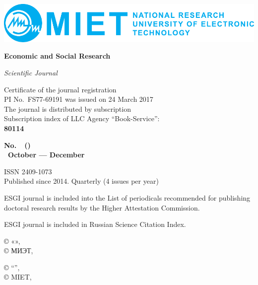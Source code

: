 \begin{center}
  \includegraphics[width=\textwidth]{logo-en}

  {\fontsize{16pt}{20pt}\selectfont\bfseries Economic and Social Research \par}

  {\itshape Scientific Journal}
\end{center}

\noindent
\begin{minipage}{.5\textwidth}
  \small
  Certificate of the journal registration\\
  PI No. FS77-69191 was issued on 24 March 2017\\
  The journal is distributed by subscription\\
  Subscription index of LLC Agency ``Book-Service'':\\
\textbf{80114}
\end{minipage}%
\begin{minipage}{.5\textwidth}
\begin{flushright}
  {\fontsize{16pt}{20pt}\selectfont\bfseries No. \esgiNum~(\esgiNumT)\\
  \esgiYear October — December\par}

  \vspace{5mm}
  \small
  ISSN 2409-1073\\
  Published since 2014. Quarterly (4 issues per year)
\end{flushright}
\end{minipage}

\begin{flushleft}
  \small
  ESGI journal is included into the List of periodicals recommended for publishing doctoral research results by
  the Higher Attestation Commission.

  \vspace{5mm}
  ESGI journal is included in Russian Science Citation Index.
\end{flushleft}

\vfill

\noindent\hrulefill

\noindent
\begin{minipage}{.6\textwidth}
\begin{flushleft}
  \scriptsize
  © «\esgiName{}», \esgiYear\\
  © МИЭТ, \esgiYear
\end{flushleft}
\end{minipage}%
\begin{minipage}{.4\textwidth}
\begin{flushright}
  \scriptsize
  © ``\esgiNameEn{}'', \esgiYear\\
  © MIET, \esgiYear
\end{flushright}
\end{minipage}

\clearpage